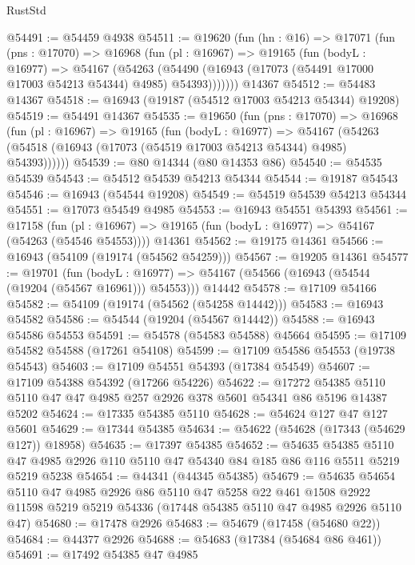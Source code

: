 \begin{lexlean}{RustStd}
\begin{coremodule}
@54491 := @54459 @4938
@54511 := @19620
    (fun (hn : @16) =>
    @17071
      (fun (pns : @17070) =>
      @16968
        (fun (pl : @16967) =>
        @19165
          (fun (bodyL : @16977) =>
          @54167
            (@54263
              (@54490 (@16943 (@17073 (@54491 @17000 @17003 @54213 @54344) @4985) @54393)))))))
    @14367
@54512 := @54483 @14367
@54518 := @16943 (@19187 (@54512 @17003 @54213 @54344) @19208)
@54519 := @54491 @14367
@54535 := @19650
    (fun (pns : @17070) =>
    @16968
      (fun (pl : @16967) =>
      @19165
        (fun (bodyL : @16977) =>
        @54167 (@54263 (@54518 (@16943 (@17073 (@54519 @17003 @54213 @54344) @4985) @54393))))))
@54539 := @80 @14344 (@80 @14353 @86)
@54540 := @54535 @54539
@54543 := @54512 @54539 @54213 @54344
@54544 := @19187 @54543
@54546 := @16943 (@54544 @19208)
@54549 := @54519 @54539 @54213 @54344
@54551 := @17073 @54549 @4985
@54553 := @16943 @54551 @54393
@54561 := @17158
    (fun (pl : @16967) => @19165 (fun (bodyL : @16977) => @54167 (@54263 (@54546 @54553))))
    @14361
@54562 := @19175 @14361
@54566 := @16943 (@54109 (@19174 (@54562 @54259)))
@54567 := @19205 @14361
@54577 := @19701
    (fun (bodyL : @16977) => @54167 (@54566 (@16943 (@54544 (@19204 (@54567 @16961))) @54553)))
    @14442
@54578 := @17109 @54166
@54582 := @54109 (@19174 (@54562 (@54258 @14442)))
@54583 := @16943 @54582
@54586 := @54544 (@19204 (@54567 @14442))
@54588 := @16943 @54586 @54553
@54591 := @54578 (@54583 @54588) @45664
@54595 := @17109 @54582 @54588 (@17261 @54108)
@54599 := @17109 @54586 @54553 (@19738 @54543)
@54603 := @17109 @54551 @54393 (@17384 @54549)
@54607 := @17109 @54388 @54392 (@17266 @54226)
@54622 := @17272
    @54385
    @5110
    @5110
    @47
    @47
    @4985
    @257
    @2926
    @378
    @5601
    @54341
    @86
    @5196
    @14387
    @5202
@54624 := @17335 @54385 @5110
@54628 := @54624 @127 @47 @127 @5601
@54629 := @17344 @54385
@54634 := @54622 (@54628 (@17343 (@54629 @127)) @18958)
@54635 := @17397 @54385
@54652 := @54635
    @54385
    @5110
    @47
    @4985
    @2926
    @110
    @5110
    @47
    @54340
    @84
    @185
    @86
    @116
    @5511
    @5219
    @5219
    @5238
@54654 := @44341 (@44345 @54385)
@54679 := @54635
    @54654
    @5110
    @47
    @4985
    @2926
    @86
    @5110
    @47
    @5258
    @22
    @461
    @1508
    @2922
    @11598
    @5219
    @5219
    @54336
    (@17448 @54385 @5110 @47 @4985 @2926 @5110 @47)
@54680 := @17478 @2926
@54683 := @54679 (@17458 (@54680 @22))
@54684 := @44377 @2926
@54688 := @54683 (@17384 (@54684 @86 @461))
@54691 := @17492 @54385 @47 @4985

\end{coremodule}
\end{lexlean}
